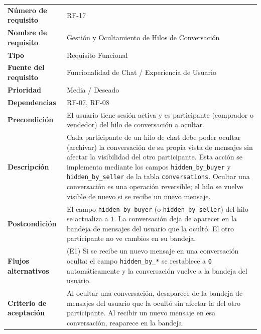 \documentclass[11pt,a4paper]{report}
\begin{document}
\begin{table}[H]
\centering
\begin{tabularx}{\textwidth}{|l|L|}
\hline
{} \\ \hline
\textbf{Número de requisito} & RF-17 \\ \hline
\textbf{Nombre de requisito} & Gestión y Ocultamiento de Hilos de Conversación \\ \hline
\textbf{Tipo} & Requisito Funcional \\ \hline
\textbf{Fuente del requisito} & Funcionalidad de Chat / Experiencia de Usuario \\ \hline
\textbf{Prioridad} & Media / Deseado \\ \hline
\textbf{Dependencias} & RF-07, RF-08 \\ \hline
\textbf{Precondición} & El usuario tiene sesión activa y es participante (comprador o vendedor) del hilo de conversación a ocultar. \\ \hline
\textbf{Descripción} & Cada participante de un hilo de chat debe poder ocultar (archivar) la conversación de su propia vista de mensajes sin afectar la visibilidad del otro participante. Esta acción se implementa mediante los campos \texttt{hidden\_by\_buyer} y \texttt{hidden\_by\_seller} de la tabla \texttt{conversations}. Ocultar una conversación es una operación reversible; el hilo se vuelve visible de nuevo si se recibe un nuevo mensaje. \\ \hline
\textbf{Postcondición} & El campo \texttt{hidden\_by\_buyer} (o \texttt{hidden\_by\_seller}) del hilo se actualiza a \texttt{1}. La conversación deja de aparecer en la bandeja de mensajes del usuario que la ocultó. El otro participante no ve cambios en su bandeja. \\ \hline
\textbf{Flujos alternativos} & (E1) Si se recibe un nuevo mensaje en una conversación oculta: el campo \texttt{hidden\_by\_*} se restablece a \texttt{0} automáticamente y la conversación vuelve a la bandeja del usuario. \\ \hline
\textbf{Criterio de aceptación} & Al ocultar una conversación, desaparece de la bandeja de mensajes del usuario que la ocultó sin afectar la del otro participante. Al recibir un nuevo mensaje en esa conversación, reaparece en la bandeja. \\ \hline
\end{tabularx}
\end{table}
\end{document}
